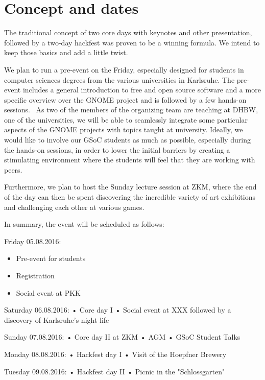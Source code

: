 
\section{Concept and dates}

The traditional concept of two core days with keynotes and other presentation, followed by a two-day hackfest was proven to be a winning formula. We intend to keep those basics and add a little twist. 

We plan to run a pre-event on the Friday, especially designed for students in computer sciences degrees from the various universities in Karlsruhe. The pre-event includes a general introduction to free and open source software and a more specific overview over the GNOME project and is followed by a few hands-on sessions.  As two of the members of the organizing team are teaching at DHBW, one of the universities, we will be able to seamlessly integrate some particular aspects of the GNOME projects with topics taught at university. Ideally, we would like to involve our GSoC students as much as possible, especially during the hands-on sessions, in order to lower the initial barriers by creating a stimulating environment where the students will feel that they are working with peers. 

Furthermore, we plan to host the Sunday lecture session at ZKM, where the end of the day can then be spent discovering the incredible variety of art exhibitions and challenging each other at various games.

In summary, the event will be scheduled as follows:

Friday 05.08.2016:
\begin{itemize}
\item Pre-event for students
\item Registration
\item Social event at PKK 
\end{itemize}

Saturday 06.08.2016:
• Core day I
• Social event at XXX followed by a discovery of Karlsruhe's night life

Sunday 07.08.2016:
• Core day II at ZKM
• AGM
• GSoC Student Talks

Monday 08.08.2016:
• Hackfest day I
• Visit of the Hoepfner Brewery 

Tuesday 09.08.2016:
• Hackfest day II
• Picnic in the "Schlossgarten" 

